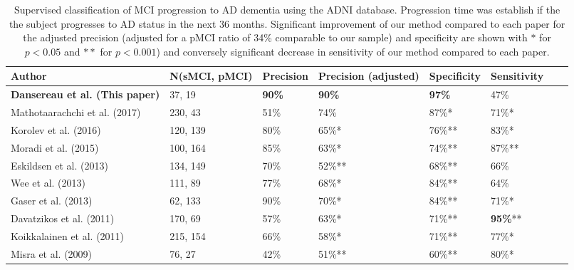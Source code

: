 \documentclass[authoryear]{elsarticle}
\begin{document}
\begin{table}[]
\centering
\caption{Supervised classification of MCI progression to AD dementia using the ADNI database. Progression time was establish if the the subject progresses to AD status in the next 36 months. Significant improvement of our method compared to each paper for the adjusted precision (adjusted for a pMCI ratio of 34\% comparable to our sample) and specificity are shown with $*$ for $p<0.05$ and $**$ for $p<0.001$) and conversely significant decrease in sensitivity of our method compared to each paper.}
\label{table_lit}
\begin{tabular}{llllllll}
Author                                 & N(sMCI, pMCI) & Precision & Precision (adjusted)   & Specificity   & Sensitivity   \\ \hline
\textbf{Dansereau et al. (This paper)}      & 37, 19        & \textbf{90\%} & \textbf{90\%} & \textbf{97\%} & 47\%   \\
Mathotaarachchi et al. (2017)              & 230, 43          & 51\%             & 74\%              & 87\%*           & 71\%*         \\
Korolev et al. (2016)                                & 120, 139    & 80\%             & 65\%*            & 76\%**          & 83\%*       \\
Moradi et al. (2015)                             & 100, 164         & 85\%            & 63\%*            & 74\%**          & 87\%**          \\ 
Eskildsen et al. (2013)                           & 134, 149      & 70\%             & 52\%**           & 68\%**         & 66\%          \\ 
Wee et al. (2013)                                   & 111, 89         & 77\%            & 68\%*            & 84\%**         & 64\%          \\ 
Gaser et al. (2013)                                 & 62, 133        & 90\%             & 70\%*           & 84\%**         & 71\%*          \\ 
Davatzikos et al. (2011)                         & 170, 69       & 57\%              & 63\%*           & 71\%**        & \textbf{95\%}** \\ 
Koikkalainen et al. (2011)                      & 215, 154     & 66\%              & 58\%*           & 71\%**        & 77\%*          \\ 
Misra et al. (2009)                              & 76, 27         & 42\%              & 51\%**         & 60\%**          & 80\%*          \\ 
\end{tabular}
\end{table}
\end{document}
